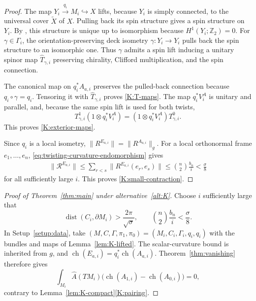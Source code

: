 \documentclass[12pt,reqno]{amsart}
\numberwithin{equation}{section}
\theoremstyle{definition}
\newcommand{\Ahat}{\widehat A}
\newcommand{\ch}{\operatorname{ch}}
\newcommand{\dist}{\operatorname{dist}}
\newcommand{\cR}{\mathcal R}
\begin{document}
\begin{proof}
The map $Y_i\xrightarrow{q_i}M_i\hookrightarrow X$ lifts, because
$Y_i$ is simply connected, to the universal cover $\widetilde X$ of
$X$.  Pulling back its spin structure gives a spin structure on
$Y_i$.  By \cite[Chapter~II, Theorem~1.7]{LawsonMichelsohn}, this
structure is unique up to isomorphism because
$H^1(Y_i;\mathbb Z_2)=0$.  For $\gamma\in\Gamma_i$, the
orientation-preserving deck isometry $\gamma:Y_i\to Y_i$ pulls back
the spin structure to an isomorphic one.  Thus $\gamma$ admits a
spin lift inducing a unitary spinor map $\widehat T_{\gamma,i}$
preserving chirality, Clifford multiplication, and the spin connection.

The canonical map on $q_i^*A_{a,i}$ preserves the pulled-back
connection because $q_i\circ\gamma=q_i$.
Tensoring it with $\widehat T_{\gamma,i}$ proves
\ref{K:T-maps}.  The map $q_i^*V_i^A$ is unitary and parallel, and,
because the same spin lift is used for both twists,
\[
 T^1_{\gamma,i}(1\otimes q_i^*V_i^A)
 =(1\otimes q_i^*V_i^A)T^0_{\gamma,i}.
\]
This proves \ref{K:exterior-maps}.

Since $q_i$ is a local isometry,
$\|R^{E_{a,i}}\|=\|R^{A_{a,i}}\|_g$.  For a local orthonormal frame
$e_1,\ldots,e_n$, \eqref{eq:twisting-curvature-endomorphism} gives
\[
\begin{aligned}
 \|\cR^{E_{a,i}}\|
 \leq\sum_{r<s}
   \|R^{E_{a,i}}(e_r,e_s)\|
 \leq\binom n2\frac{b_n}{i}<\frac{\sigma}{8}
\end{aligned}
\]
for all sufficiently large $i$.  This proves
\ref{K:small-contraction}.
\end{proof}

\begin{proof}[Proof of Theorem~\ref{thm:main} under
alternative~\ref{alt:K}]
Choose $i$ sufficiently large that
\[
 \dist(C_i,\partial M_i)>\frac{2\pi}{\sqrt\sigma},
 \qquad
 \binom n2\frac{b_n}{i}<\frac{\sigma}{8}.
\]
In Setup~\ref{setup:data}, take
$(M,C,\Gamma,\pi_1,\pi_0)=(M_i,C_i,\Gamma_i,q_i,q_i)$
with the bundles and maps of Lemma~\ref{lem:K-lifted}.
The scalar-curvature bound is inherited from $g$, and
$\ch(E_{a,i})=q_i^*\ch(A_{a,i})$.  Theorem~\ref{thm:vanishing}
therefore gives
\[
 \int_{M_i}\Ahat(TM_i)
 \bigl(\ch(A_{1,i})-\ch(A_{0,i})\bigr)=0,
\]
contrary to Lemma~\ref{lem:K-compact}\ref{K:pairing}.
\end{proof}

\end{document}
